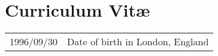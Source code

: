 \chapter{Curriculum Vit\ae}%
\label{chap:cv}

\makeatletter
\authors{\@firstname\ {\titleshape\@lastname}}
\makeatother

\noindent
\begin{longtable}{p{} p{}}
  1996/09/30 & Date of birth in London, England
\end{longtable}


